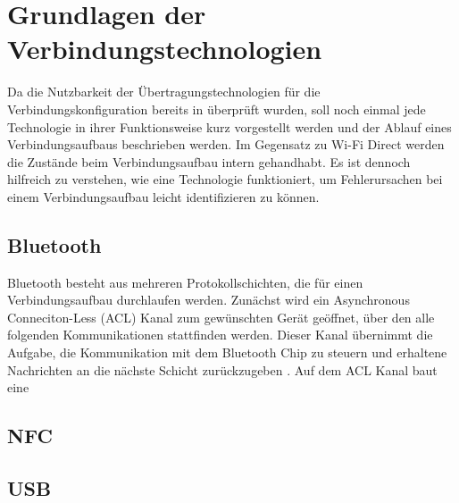 \section{Grundlagen der Verbindungstechnologien}
	Da die Nutzbarkeit der Übertragungstechnologien für die Verbindungskonfiguration bereits in \cite{aiProject} überprüft wurden, soll noch einmal jede Technologie in ihrer Funktionsweise kurz vorgestellt werden und der Ablauf eines Verbindungsaufbaus beschrieben werden. Im Gegensatz zu Wi-Fi Direct werden die Zustände beim Verbindungsaufbau intern gehandhabt. Es ist dennoch hilfreich zu verstehen, wie eine Technologie funktioniert, um Fehlerursachen bei einem Verbindungsaufbau leicht identifizieren zu können.
	
	\subsection{Bluetooth}
	
	Bluetooth besteht aus mehreren Protokollschichten, die für einen Verbindungsaufbau durchlaufen werden. Zunächst wird ein Asynchronous Conneciton-Less (ACL) Kanal zum gewünschten Gerät geöffnet, über den alle folgenden Kommunikationen stattfinden werden. Dieser Kanal übernimmt die Aufgabe, die Kommunikation mit dem Bluetooth Chip zu steuern und erhaltene Nachrichten an die nächste Schicht zurückzugeben \cite[S.400]{Sauter}. Auf dem ACL Kanal baut eine 
	
	\subsection{NFC}
	
	\subsection{USB}
